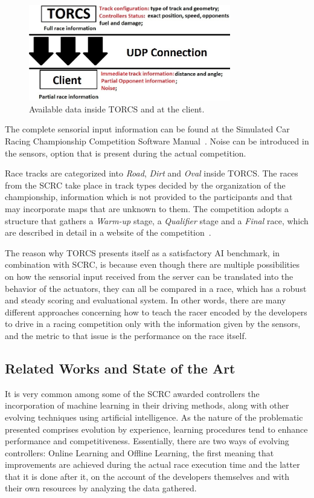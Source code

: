    	\begin{figure}[h]
		\centering
		\includegraphics[width=250pt]{Figure1}
		\caption{\label{Fig:1}Available data inside TORCS and at the client.}
	\end{figure}
	
	The complete sensorial input information can be found at the Simulated Car Racing Championship Competition Software Manual~\cite{SCRC}. Noise can be introduced in the sensors, option that is present during the actual competition.

	Race tracks are categorized into \emph{Road}, \emph{Dirt} and \emph{Oval} inside TORCS. The races from the SCRC take place in track types decided by the organization of the championship, information which is not provided to the participants and that may incorporate maps that are unknown to them. The competition adopts a structure that gathers a \textit{Warm-up} stage, a \textit{Qualifier} stage and a \textit{Final} race, which are described in detail in a website of the competition~\cite{SCRC}.
	
	The reason why TORCS presents itself as a satisfactory AI benchmark, in combination with SCRC, is because even	though there are multiple possibilities on how the sensorial input received from the server can be translated into the behavior of the actuators, they can all be compared in a race, which has a robust and steady scoring and evaluational system. In other words, there are many different approaches concerning how to teach the racer encoded by the developers to drive in a racing competition only with the information given by the sensors, and the metric to that issue is the performance on the race itself.

\subsection{Related Works and State of the Art} \label{subsec:Related}
	
	It is very common among some of the SCRC awarded controllers the incorporation of machine learning in their driving methods, along with other evolving techniques using artificial intelligence. As the nature of the problematic presented comprises evolution by experience, learning procedures tend to enhance performance and competitiveness. Essentially, there are two ways of evolving controllers: Online Learning and Offline Learning, the first meaning that improvements are achieved during the actual race execution time and the latter that it is done after it, on the account of the developers themselves and with their own resources by analyzing the data gathered.
	
